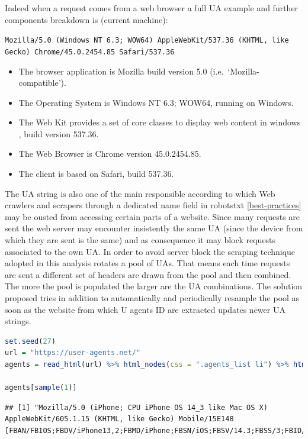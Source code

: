 \documentclass[
  12pt,
  a4paper,
  oneside]{book}
\newcommand{\passthrough}[1]{#1}
\providecommand{\tightlist}{%
  \setlength{\itemsep}{0pt}\setlength{\parskip}{0pt}}
\theoremstyle{definition}
\theoremstyle{definition}
\theoremstyle{definition}
\theoremstyle{remark}
\begin{document}
Indeed when a request comes from a web browser a full UA example and further components breakdown is (current machine):

\passthrough{\lstinline!Mozilla/5.0 (Windows NT 6.3; WOW64) AppleWebKit/537.36 (KHTML, like Gecko) Chrome/45.0.2454.85 Safari/537.36!}

\begin{itemize}
\tightlist
\item
  The browser application is Mozilla build version 5.0 (i.e.~`Mozilla-compatible').
\item
  The Operating System is Windows NT 6.3; WOW64, running on Windows.
\item
  The Web Kit provides a set of core classes to display web content in windows \citep{UserAgen23}, build version 537.36.
\item
  The Web Browser is Chrome version 45.0.2454.85.
\item
  The client is based on Safari, build 537.36.
\end{itemize}

The UA string is also one of the main responsible according to which Web crawlers and scrapers through a dedicated name field in robotstxt \ref{best-practices} may be ousted from accessing certain parts of a website. Since many requests are sent the web server may encounter insistently the same UA (since the device from which they are sent is the same) and as consequence it may block requests associated to the own UA. In order to avoid server block the scraping technique adopted in this analysis rotates a pool of UAs. That means each time requests are sent a different set of headers are drawn from the pool and then combined. The more the pool is populated the larger are the UA combinations. The solution proposed tries in addition to automatically and periodically resample the pool as soon as the website from which U agents ID are extracted updates newer UA strings.

\begin{lstlisting}[language=R]
set.seed(27)
url = "https://user-agents.net/"
agents = read_html(url) %>% html_nodes(css = ".agents_list li") %>% html_text()

agents[sample(1)]
\end{lstlisting}

\begin{lstlisting}
## [1] "Mozilla/5.0 (iPhone; CPU iPhone OS 14_3 like Mac OS X) AppleWebKit/605.1.15 (KHTML, like Gecko) Mobile/15E148 [FBAN/FBIOS;FBDV/iPhone13,2;FBMD/iPhone;FBSN/iOS;FBSV/14.3;FBSS/3;FBID/phone;FBLC/en_US;FBOP/5]"
\end{lstlisting}
\end{document}

